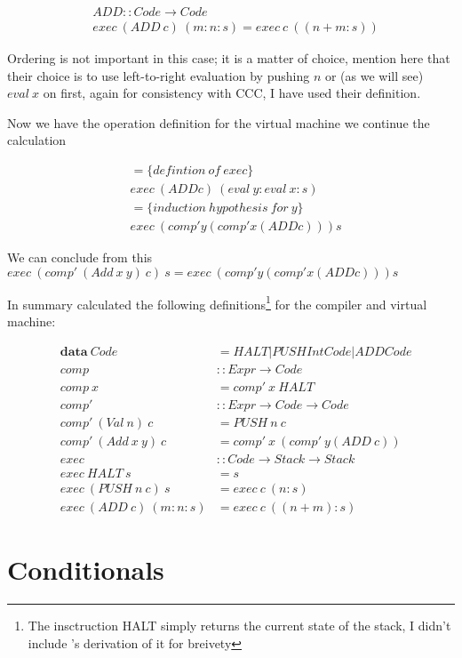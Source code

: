 \documentclass {article}
\begin{document}
\begin{align*}
	&ADD :: Code \rightarrow Code \\
	&exec \ (ADD \ c) \ (m:n:s) = exec \ c \ ((n+m:s))
\end{align*}

Ordering is not important in this case; it is a matter of choice,
\BH mention here that their choice is to use
left-to-right evaluation by pushing $n$ 
or (as we will see)  $eval \ x$ on first,
again for consistency with CCC, 
I have used their definition.

Now we have the operation definition for the 
virtual machine we continue the calculation 

\begin{align*}
	&= \{ defintion \ of \ exec \} \\
	&exec \ (ADD c) \ (eval \ y : eval \ x : s) \\
	&= \{ induction \ hypothesis \ for \ y \} \\
	&exec \ (comp' y (comp' x (ADD c))) s
\end{align*}

We can conclude from this 
\( exec \ (comp' \ (Add \ x \ y) \ c) \ s = exec \ (comp' y (comp' x (ADD c))) s\)

In summary \BH calculated the following definitions\footnote{
The insctruction HALT simply returns the current state of the stack,
I didn't include \BH's derivation of it for breivety}
for the compiler and virtual machine:

\begin{eqnarray*}
	&\textbf{data} \ Code &= HALT | PUSH Int Code | ADD Code \\
	&comp &:: Expr \rightarrow Code \\
	&comp \ x &= comp' \ x \ HALT \\
	&comp' &:: Expr \rightarrow Code \rightarrow Code \\
	&comp' \ (Val \ n) \ c &= PUSH \ n \ c \\
	&comp' \ (Add \ x \ y) \ c &= comp' \ x \ (comp' \ y (ADD \ c)) \\
	&exec &:: Code  \rightarrow Stack \rightarrow Stack \\
	&exec \ HALT \ s &= s \\
	&exec \ (PUSH \ n \ c) \ s &= exec \ c \ (n:s) \\
	&exec \ (ADD \ c) \ (m:n:s) &= exec \ c \ ((n + m):s)
\end{eqnarray*}


\section{Conditionals}
\end{document}
